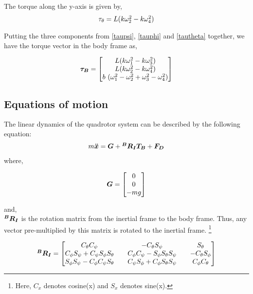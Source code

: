 \documentclass[12pt,fleqn]{article}
\newcommand{\mbm}[1]{\mbox{\boldmath $#1$}}
\begin{document}
The torque along the y-axis is given by,
\begin{equation} \label{tautheta}
$$ \tau_\theta = L (k\omega_2^2 - k\omega_4^2) $$
\end{equation}

Putting the three components from \ref{taupsi}, \ref{tauphi} and
\ref{tautheta} together, we have the torque vector in the body frame as,

\begin{equation} \label{tauvector} 
$$ \mbm{\tau_B} = \begin{bmatrix} L (k\omega_1^2 - k\omega_3^2)\\ L
  (k\omega_2^2 - k\omega_4^2) \\ b\ (\omega_1^2 - \omega_2^2 + \omega_3^2 -
\omega_4^2) \end{bmatrix} $$
\end{equation}

\subsection{Equations of motion}

The linear dynamics of the quadrotor system can be described by the
following equation:
\begin{equation} \label{eom_linear}
$$ m \mbm{\ddot{x}} = \mbm{G} + \mbm{^BR_IT_{B}} + \mbm{F_{D}} $$
\end{equation}
where, 

$$ \mbm{G} = \begin{bmatrix} 0 \\ 0 \\ -mg \end{bmatrix} $$

and,\\ 

$ \mbm{^BR_I} $ is the rotation matrix from the inertial frame to the
body frame. Thus, any vector pre-multiplied by this matrix is
rotated to the inertial frame. \footnote{Here, $C_x$ denotes cosine(x)
  and $S_x$ denotes sine(x).} 

\begin{equation} \label{rotation_matrix}
$$ \mbm{^BR_I} = \begin{bmatrix} C_\theta C_\psi && -C_\theta S_\psi && S_\theta\\
C_\phi S_\psi + C_\psi S_\phi S_\theta&& C_\phi C_\psi - S_\phi
S_\theta S_\psi&& -C_\theta S_\phi\\
S_\phi S_\psi - C_\phi C_\psi S_\theta&&
C_\psi S_\phi + C_\phi S_\theta S_\psi&&
C_\phi C_\theta \end{bmatrix} $$
\\
\end{equation}
\end{document}

